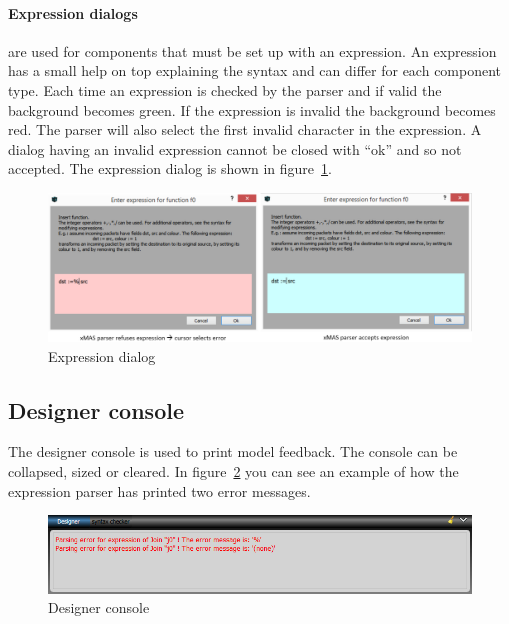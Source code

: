 \paragraph{Expression dialogs} \label{sec:expression-dialogs}
are used for components that must be set up with
an expression. An expression has a small help on top explaining the syntax and
can differ for each component type. Each time an expression is checked by the
parser and if valid the background becomes green. If the expression is invalid
the background becomes red. The parser will also select the first invalid
character in the expression. A dialog having an invalid expression cannot be
closed with ``ok'' and so not accepted. The expression dialog is shown
in figure~\ref{fig:expression-dialog}.

\begin{figure}[here]
\begin{center}	
	\includegraphics[width=.90\linewidth]{pictures/expression-dialog}
	\caption{Expression dialog}
	\label{fig:expression-dialog}
\end{center}
\end{figure}



\subsection{Designer console}
The designer console is used to print model feedback. The console can be
collapsed, sized or cleared. In figure~\ref{fig:designer-console} you can see an
example of how the expression parser has printed two error messages.

\begin{figure}[here]
\begin{center}	
	\includegraphics[width=.70\linewidth]{pictures/designer-console}
	\caption{Designer console}
	\label{fig:designer-console}
\end{center}
\end{figure}



